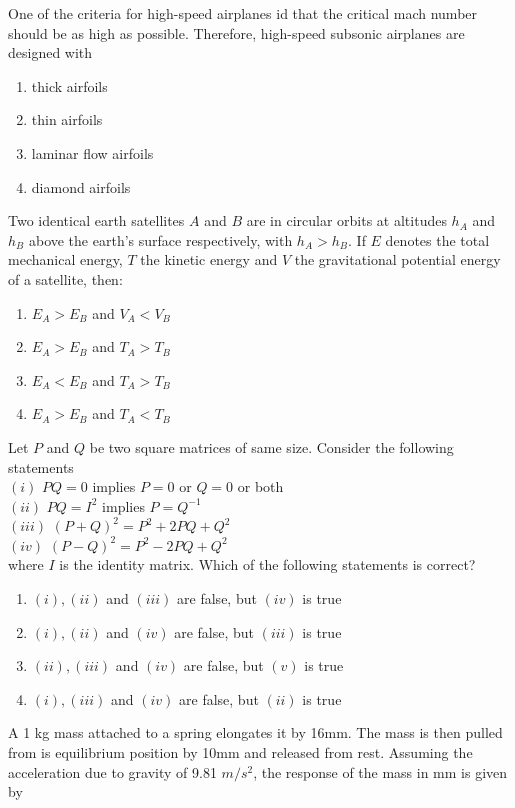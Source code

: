 \item One of the criteria for high-speed airplanes id that the critical mach number should be as high as possible. Therefore, high-speed subsonic airplanes are designed with
\begin{enumerate}
    \item thick airfoils
    \item thin airfoils
    \item laminar flow airfoils
    \item diamond airfoils
\end{enumerate}
\item Two identical earth satellites $A$ and $B$ are in circular orbits at altitudes $h_{A}$ and $h_{B}$ above the earth's surface respectively, with $h_{A}>h_{B}$. If $E$ denotes the total mechanical energy, $T$ the kinetic energy and $V$ the gravitational potential energy of a satellite, then:
\begin{enumerate}
    \item $E_{A}>E_{B}$ and $V_{A}<V_{B}$
    \item $E_{A}>E_{B}$ and $T_{A}>T_{B}$
    \item $E_{A}<E_{B}$ and $T_{A}>T_{B}$
    \item $E_{A}>E_{B}$ and $T_{A}<T_{B}$
\end{enumerate}
\item Let $P$ and $Q$ be two square matrices of same size. Consider the following statements \\
     $(i)$ $PQ=0$ implies $P=0$ or $Q=0$ or both \\
     $(ii)$ $PQ=I^{2}$ implies $P=Q^{-1}$ \\
     $(iii)$ $(P+Q)^{2}=P^{2}+2PQ+Q^{2}$ \\
     $(iv)$ $(P-Q)^{2}=P^{2}-2PQ+Q^{2}$ \\ 
     where $I$ is the identity matrix. Which of the following statements is correct?
     \begin{enumerate}
         \item $(i),(ii)$ and $(iii)$ are false, but $(iv)$ is true
         \item $(i),(ii)$ and $(iv)$ are false, but $(iii)$ is true
         \item $(ii),(iii)$ and $(iv)$ are false, but $(v)$ is true
        \item $(i),(iii)$ and $(iv)$ are false, but $(ii)$ is true
     \end{enumerate}
     \item A 1 kg mass attached to a spring elongates it by 16mm. The mass is then pulled from is equilibrium position by 10mm and released from rest. Assuming the acceleration due to gravity of 9.81 $m/s^{2}$, the response of the mass in mm is given by
